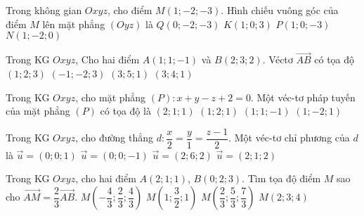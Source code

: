 \begin{ex}%
	Trong không gian $ Oxyz  $, cho điểm $ M(1;-2;-3) $. Hình chiếu vuông góc của điểm $ M $ lên mặt phẳng $ (Oyz) $ là
	\choice
	{\True $ Q(0;-2;-3) $}
	{$ K(1;0;3) $}
	{$ P(1;0;-3) $}
	{$ N(1;-2;0) $}
\end{ex}

\begin{ex}%
	Trong KG $Oxyz$, Cho hai điểm $A(1;1;-1)$ và $B(2;3;2)$. Véctơ $\vec{AB}$ có tọa độ
	\choice
	{\True $(1;2;3)$}
	{$(-1;-2;3)$}
	{$(3;5;1)$}
	{$(3;4;1)$}
\end{ex}


\begin{ex}%
	Trong KG $Oxyz$, cho mặt phẳng $(P)\colon x+y-z+2=0$. Một véc-tơ pháp tuyến của mặt phẳng $(P)$ có tọa độ là
	\choice
	{$(2;1;1)$}
	{$(1;2;1)$}
	{\True $(1;1;-1)$}
	{$(1;-2;1)$}
\end{ex}


\begin{ex}%
	Trong KG $Oxyz$, cho đường thẳng $d\colon \dfrac{x}{2}=\dfrac{y}{1}=\dfrac{z-1}{2}$. Một véc-tơ chỉ phương của $d$ là
	\choice
	{$\vec{u}=(0;0;1)$}
	{$\vec{u}=(0;0;-1)$}
	{$\vec{u}=(2;6;2)$}
	{\True $\vec{u}=(2;1;2)$}
\end{ex}


\begin{ex}%
	Trong KG $Oxyz$, cho hai điểm $A(2;1;1)$, $B(0;2;3)$. Tìm tọa độ điểm $M$ sao cho $\overrightarrow{AM}=\dfrac{2}{3}\overrightarrow{AB}$.
	\choice
	{$M\left(-\dfrac{4}{3};\dfrac{2}{3};\dfrac{4}{3}\right)$}
	{$M\left(1;\dfrac{3}{2};1\right)$}
	{\True $M\left(\dfrac{2}{3};\dfrac{5}{3};\dfrac{7}{3}\right)$}
	{$M\left(2;3;4\right)$}
\end{ex}


